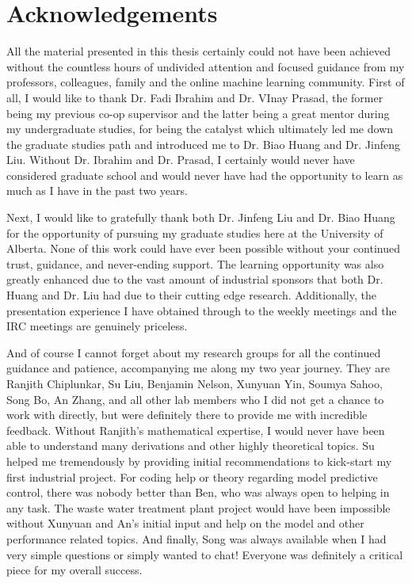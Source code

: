 \documentclass[12pt]{report}
\begin{document}
\tableofcontents
\listoffigures
\listoftables

\chapter*{Acknowledgements}
All the material presented in this thesis certainly could not have been achieved without the countless hours of undivided attention and focused guidance from my professors, colleagues, family and the online machine learning community. First of all, I would like to thank Dr. Fadi Ibrahim and Dr. VInay Prasad, the former being my previous co-op supervisor and the latter being a great mentor during my undergraduate studies, for being the catalyst which ultimately led me down the graduate studies path and introduced me to Dr. Biao Huang and Dr. Jinfeng Liu. Without Dr. Ibrahim and Dr. Prasad, I certainly would never have considered graduate school and would never have had the opportunity to learn as much as I have in the past two years.  

Next, I would like to gratefully thank both Dr. Jinfeng Liu and Dr. Biao Huang for the opportunity of pursuing my graduate studies here at the University of Alberta.  None of this work could have ever been possible without your continued trust, guidance, and never-ending support.  The learning opportunity was also greatly enhanced due to the vast amount of industrial sponsors that both Dr. Huang and Dr. Liu had due to their cutting edge research.  Additionally, the presentation experience I have obtained through to the weekly meetings and the IRC meetings are genuinely priceless.

And of course I cannot forget about my research groups for all the continued guidance and patience, accompanying me along my two year journey.  They are Ranjith Chiplunkar, Su Liu, Benjamin Nelson, Xunyuan Yin, Soumya Sahoo, Song Bo, An Zhang, and all other lab members who I did not get a chance to work with directly, but were definitely there to provide me with incredible feedback.  Without Ranjith's mathematical expertise, I would never have been able to understand many derivations and other highly theoretical topics.  Su helped me tremendously by providing initial recommendations to kick-start my first industrial project.  For coding help or theory regarding model predictive control, there was nobody better than Ben, who was always open to helping in any task. The waste water treatment plant project would have been impossible without Xunyuan and An's initial input and help on the model and other performance related topics.  And finally, Song was always available when I had very simple questions or simply wanted to chat!  Everyone was definitely a critical piece for my overall success.  
\end{document}
